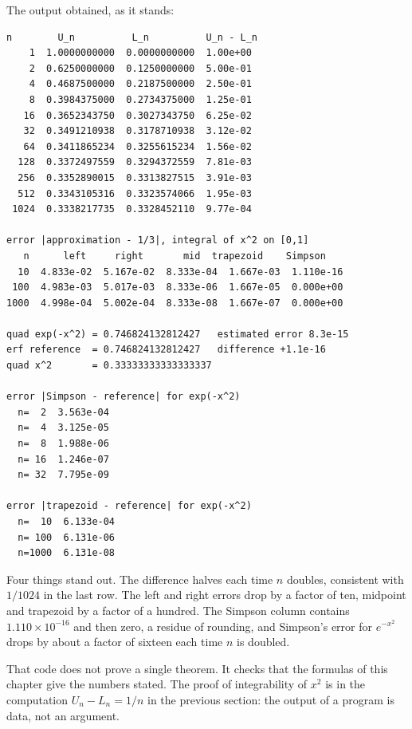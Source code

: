 The output obtained, as it stands:

\begin{verbatim}
n        U_n          L_n          U_n - L_n
    1  1.0000000000  0.0000000000  1.00e+00
    2  0.6250000000  0.1250000000  5.00e-01
    4  0.4687500000  0.2187500000  2.50e-01
    8  0.3984375000  0.2734375000  1.25e-01
   16  0.3652343750  0.3027343750  6.25e-02
   32  0.3491210938  0.3178710938  3.12e-02
   64  0.3411865234  0.3255615234  1.56e-02
  128  0.3372497559  0.3294372559  7.81e-03
  256  0.3352890015  0.3313827515  3.91e-03
  512  0.3343105316  0.3323574066  1.95e-03
 1024  0.3338217735  0.3328452110  9.77e-04

error |approximation - 1/3|, integral of x^2 on [0,1]
   n      left     right       mid  trapezoid    Simpson
  10  4.833e-02  5.167e-02  8.333e-04  1.667e-03  1.110e-16
 100  4.983e-03  5.017e-03  8.333e-06  1.667e-05  0.000e+00
1000  4.998e-04  5.002e-04  8.333e-08  1.667e-07  0.000e+00

quad exp(-x^2) = 0.746824132812427   estimated error 8.3e-15
erf reference  = 0.746824132812427   difference +1.1e-16
quad x^2       = 0.33333333333333337

error |Simpson - reference| for exp(-x^2)
  n=  2  3.563e-04
  n=  4  3.125e-05
  n=  8  1.988e-06
  n= 16  1.246e-07
  n= 32  7.795e-09

error |trapezoid - reference| for exp(-x^2)
  n=  10  6.133e-04
  n= 100  6.131e-06
  n=1000  6.131e-08
\end{verbatim}

Four things stand out. The difference halves each time $n$ doubles, consistent with $1/1024$
in the last row. The left and right errors drop by a factor of ten, midpoint and
trapezoid by a factor of a hundred. The Simpson column contains $1.110\times10^{-16}$ and then zero, a residue
of rounding, and Simpson's error for $e^{-x^2}$ drops by about a factor of sixteen
each time $n$ is doubled.

That code does not prove a single theorem. It checks that the formulas of this chapter give
the numbers stated. The proof of integrability of $x^2$ is in the computation $U_n-L_n=1/n$
in the previous section: the output of a program is data, not an argument.

